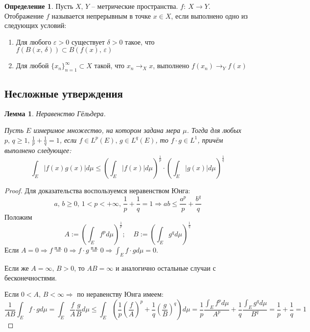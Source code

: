 \documentclass[a4paper,12pt]{article}
\renewcommand{\leq}{\ensuremath{\leqslant}}
\renewcommand{\geq}{\ensuremath{\geqslant}}
\theoremstyle{plain}
\newtheorem{lemma}{Лемма}[section]
\theoremstyle{definition}
\newtheorem{definition}{Определение}[section]
\theoremstyle{remark}
\begin{document}
\begin{definition}
	Пусть $X,\, Y$ -- метрические пространства. $f :\: X \to Y$. Отображение $f$ называется непрерывным в точке $x \in X$, если выполнено одно из следующих условий:
	\begin{enumerate}
		\item Для любого $\varepsilon > 0$ существует $\delta > 0$ такое, что $f(B(x,\, \delta)) \subset B(f(x),\, \varepsilon)$
		\item Для любой $\{x_n\}_{n = 1}^\infty \subset X$ такой, что $x_n \to_X x$, выполнено $f(x_n) \to_Y f(x)$
	\end{enumerate}
\end{definition}

\subsection{Несложные утверждения}

\begin{lemma}
	Неравенство Гёльдера.

	Пусть $E$ измеримое множество, на котором задана мера $\mu$. Тогда для любых $p,\,q \geq 1,\, \frac{1}{p} + \frac{1}{q} = 1$, если $f \in L^p(E),\, g \in L^q(E)$, то $f \cdot g \in L^1$, причём выполнено следующее:
	\[
		\int_E \vert f(x)g(x) \vert d\mu \leq \left(\int_E \vert f(x)\vert d\mu\right)^{\frac{1}{p}} \cdot \left(\int_E \vert g(x) \vert d\mu\right)^{\frac{1}{q}}
	\]
\end{lemma}

\begin{proof}
	Для доказательства воспользуемся неравенством Юнга:
	\[
		a,\,b \geq 0,\, 1 < p < +\infty,\, \frac{1}{p} + \frac{1}{q} = 1 \Rightarrow ab \leq \frac{a^p}{p} + \frac{b^q}{q}
	\]
	Положим
	\[
		A := \left(\int_Ef^pd\mu\right)^{\frac{1}{p}} ;\;\;\;\; B := \left(\int_Eg^qd\mu\right)^{\frac{1}{q}}
	\]
	Если $A = 0 \Rightarrow f \overset{\text{п.в.}}{=} 0 \Rightarrow f\cdot g  \overset{\text{п.в.}}{=} 0 \Rightarrow \int_Ef\cdot gd\mu = 0$.

	Если же $A = \infty,\, B > 0$, то $AB = \infty$ и аналогично остальные случаи с бесконечностями.

	Если $0 < A,\, B < \infty \Rightarrow$ по неравенству Юнга имеем:
	\[
		\frac{1}{AB}\int_Ef\cdot gd\mu = \int_E\frac{f}{A}\frac{g}{B}d\mu \leq \int_E \left(\frac{1}{p}\left(\frac{f}{A}\right)^p + \frac{1}{q}\left(\frac{g}{B}\right)^q\right)d\mu = \frac{1}{p}\frac{\int_Ef^pd\mu}{A^p} + \frac{1}{q}\frac{\int_Eg^qd\mu}{B^q} = \frac{1}{p} + \frac{1}{q} = 1
	\]
\end{proof}
\end{document}
